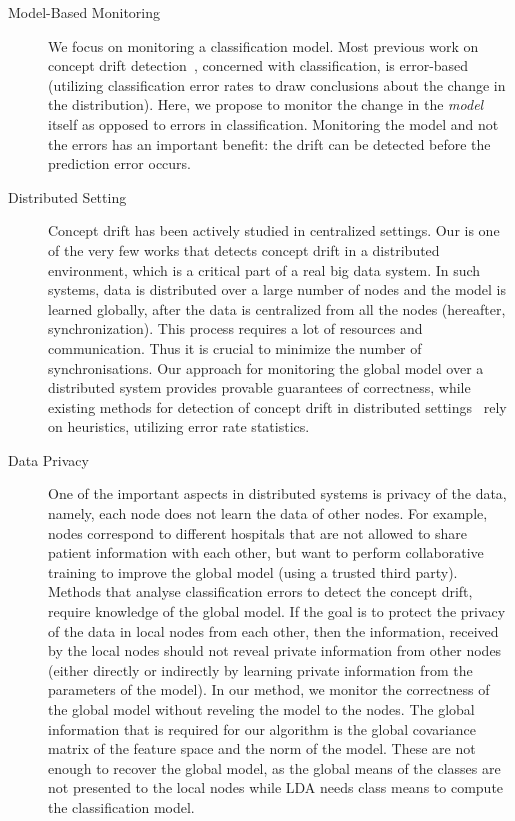 \documentclass{sig-alternate-05-2015}
\begin{document}
\begin{description}
\item[Model-Based Monitoring] We focus on monitoring a classification model.
Most previous work on concept drift detection~\cite{baena2006early,gama2004learning,Nishida2007},
concerned with classification, is error-based  (utilizing classification error rates to
draw conclusions about the change in the distribution).
Here, we propose to monitor the change in the {\em model} itself as opposed to errors in classification.
Monitoring the model and not the errors has an important benefit: the drift can
be detected before the prediction error occurs.

\item[Distributed Setting]
    Concept drift has been actively studied in centralized settings.
    Our is one of the very few works \cite{AngGZPH13} that detects concept drift in a distributed
    environment, which is a critical part of a real big data system.
    In such systems, data is distributed over a large number of nodes and the model is learned
    globally, after the data is centralized from all the nodes (hereafter, synchronization).
    This process requires a lot of resources and communication.
    Thus it is crucial to minimize the number of synchronisations.
    Our approach for monitoring the global model over a distributed system
    provides provable guarantees of correctness, while existing methods for detection of concept
    drift in distributed settings~\cite{AngGZPH13} rely on heuristics, utilizing error rate statistics.

\item[Data Privacy]
    One of the important aspects in distributed systems is privacy of the data, 
    namely, each node does not learn the data of other nodes. 
    For example, nodes correspond to different hospitals that are not allowed 
    to share patient information with each other, but want to perform 
    collaborative training to improve the global model (using a trusted third party). 
    Methods that analyse classification errors to detect the concept drift, 
    require knowledge of the global model. If the goal is to protect the 
    privacy of the data in local nodes from each other, then the information, 
    received by the local nodes should not reveal private information from other 
    nodes (either directly or indirectly by learning private information from the 
    parameters of the model). 
    In our method, we monitor the correctness of the global model without 
    reveling the model to the nodes. The global information that is required 
    for our algorithm is the global covariance matrix of the feature space 
    and the norm of the model. These are not enough to recover the global model, 
    as the global means of the classes are not presented to the local nodes 
    while LDA needs class means to compute the classification model.
\end{description}
\end{document}
